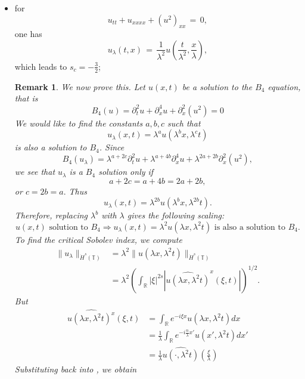 \documentclass[12pt,reqno]{amsart}
\numberwithin{equation}{section}  %
\renewcommand{\cref}{\Cref}
\newcommand{\rr}{\mathbb{R}}
\newcommand{\ci}{\mathbb{T}}
\newcommand{\wh}{\widehat}
\newtheorem{remark}[theorem]{Remark}
\begin{document}
\begin{appendices}
\begin{itemize}
  \item for 
    \[
    u_{tt}+u_{xxxx}+(u^2)_{xx}\,=\,0,
    \]
    one has 
    \[
    u_{\lambda}(t,x)\,=\,\frac{1}{\lambda^2}u\left(\frac{t}{\lambda^2}, \frac{x}{\lambda}\right),
    \]
    which leads to $s_c=-\frac 32$;
\begin{framed}
\begin{remark}
We now prove this.
Let $u(x, t)$ be a solution to the $B_4$ equation, that is
%
$$
B_4(u)=
 \partial_t^2u + \partial^4_x u + \partial_x^2(u^2)  = 0
$$
%
We would like to find the constants
$a, b, c$ such that
\[
u_\lambda (x, t) = \lambda^a u(\lambda^b x, \lambda^c t)
\]
is also a solution to $B_4$.  Since 
$$
B_4(u_\lambda)=
\lambda^{a+2c} \partial_t^2u 
+
 \lambda^{a+4b} \partial^4_x u 
 +
  \lambda^{2a+2b}
  \partial_x^2(u^2),  
$$
we see that $u_\lambda$ is a $B_4$ solution only if
$$
a+2c=a+4b=2a+2b,
$$
or
$
c= 2b =a.
$
  Thus
\[
u_\lambda (x, t) = \lambda^{2b} u(\lambda^{b}x,  \lambda^{2b} t).
\]
%
%
Therefore, replacing  $ \lambda^b$ with  $ \lambda$ gives the following scaling:
%
\begin{equation}
\label{DP-scal}
\boxed{
u(x, t) \text{ solution to }  B_4
 \Longrightarrow 
u_\lambda (x, t) = \lambda^2 u(\lambda x, \lambda^2 t)  \text { is also a
solution to }  B_4. 
}
\end{equation}
\label{rem:scaling}
To find the critical Sobolev index, we compute
%
%
\begin{equation}
\begin{split}
  \| u_{\lambda} \|_{\dot{H}^s(\ci)} 
  & = \lambda^{2} \| u(\lambda x, \lambda^2 t) \|_{\dot{H}^{s}(\ci)}
  \\
  & = \lambda^{2} \left( \int_{\rr} | \xi |^{2s} | \wh{u (\lambda x,
  \lambda^{2} t)}^x (\xi, t)| \right)^{1/2}.
\end{split}
\label{crit-ind-comp}
\end{equation}
%
But
%
%
\begin{equation*}
\begin{split}
  \wh{u(\lambda x, \lambda^{2}t)^x}(\xi, t)
  & = \int_{\rr}e^{-i\xi x}u(\lambda x, \lambda^2 t) dx
  \\
  & = \frac{1}{\lambda} \int_{\rr}e^{-i \frac{n}{\lambda} x'}u(x',
  \lambda^{2} t) dx'
  \\
  & = \frac{1}{\lambda} \wh{u(\cdot, \lambda^{2}t)}(\frac{\xi}{\lambda})
\end{split}
\end{equation*}
%
%
Substituting back into \cref{crit-ind-comp}, we obtain

\end{remark}
\end{framed}
\end{itemize}
\end{appendices}
\end{document}
